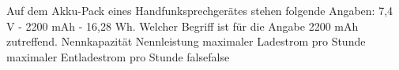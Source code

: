     {Auf dem Akku-Pack eines Handfunksprechgerätes stehen folgende Angaben: 7,4 V - 2200 mAh - 16,28 Wh. Welcher Begriff ist für die Angabe 2200 mAh zutreffend.}
    {Nennkapazität}
    {Nennleistung}
    {maximaler Ladestrom pro Stunde}
    {maximaler Entladestrom pro Stunde}
    {false}{false}